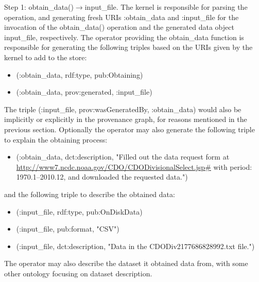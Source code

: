 Step 1: obtain\_data()$\rightarrow$input\_file. The kernel is responsible for parsing the operation, and generating fresh URIs :obtain\_data and :input\_file for the invocation of the obtain\_data() operation and the generated data object input\_file, respectively. The operator providing the obtain\_data function is responsible for generating the following triples based on the URIs given by the kernel to add to the store:
\begin{itemize}
	\item (:obtain\_data, rdf:type, pub:Obtaining)
	\item (:obtain\_data, prov:generated, :input\_file)
\end{itemize}
The triple (:input\_file, prov:wasGeneratedBy, :obtain\_data) would also be implicitly or explicitly in the provenance graph, for reasons mentioned in the previous section.
Optionally the operator may also generate the following triple to explain the obtaining process:
\begin{itemize}
	\item (:obtain\_data, dct:description, "Filled out the data request form at \url{http://www7.ncdc.noaa.gov/CDO/CDODivisionalSelect.jsp#} with period: 1970.1--2010.12, and downloaded the requested data.")
\end{itemize}
and the following triple to describe the obtained data:
\begin{itemize}
	\item (:input\_file, rdf:type, pub:OnDiskData)
	\item (:input\_file, pub:format, "CSV")
	\item (:input\_file, dct:description, "Data in the CDODiv2177686828992.txt file.")
\end{itemize}
The operator may also describe the dataset it obtained data from, with some other ontology focusing on dataset description.

